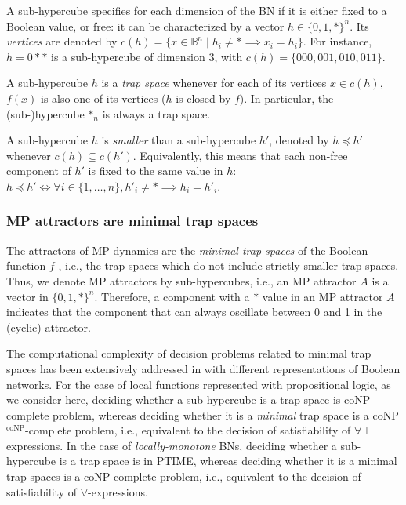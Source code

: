 \documentclass[PCJ,Unicode,screen,mode=plain]{cedram}
\begin{document}
A sub-hypercube specifies for each dimension of the BN if it is either
fixed to a Boolean value, or free: it can be characterized by a vector
\(h\in \{0,1,*\}^n\). Its \emph{vertices} are denoted by
\(c(h) = \{ x\in \mathbb B^n\mid h_i\neq *\implies x_i=h_i\}\). For
instance, \(h=0**\) is a sub-hypercube of dimension 3, with
\(c(h) = \{000, 001, 010, 011\}\).

A sub-hypercube \(h\) is a \emph{trap space} whenever for each of its
vertices \(x\in c(h)\), \(f(x)\) is also one of its vertices (\(h\) is
closed by \(f\)). In particular, the (sub-)hypercube \(\mathbf *_n\) is
always a trap space.

A sub-hypercube \(h\) is \emph{smaller} than a sub-hypercube \(h'\),
denoted by \(h \preceq h'\) whenever \(c(h)\subseteq c(h')\).
Equivalently, this means that each non-free component of \(h'\) is fixed
to the same value in \(h\):
\(h \preceq h' \iff \forall i\in \{1,\ldots,n\}, h'_i\neq *\implies h_i=h'_i\).

\hypertarget{mp-attractors-are-minimal-trap-spaces}{%
\subsubsection{MP attractors are minimal trap
spaces}\label{mp-attractors-are-minimal-trap-spaces}}

The attractors of MP dynamics are the \emph{minimal trap spaces} of the
Boolean function \(f\) \citep{Pauleve2020}, i.e., the trap spaces which
do not include strictly smaller trap spaces. Thus, we denote MP
attractors by sub-hypercubes, i.e., an MP attractor \(A\) is a vector in
\(\{0,1,*\}^n\). Therefore, a component with a \(*\) value in an MP
attractor \(A\) indicates that the component that can always oscillate
between 0 and 1 in the (cyclic) attractor.

The computational complexity of decision problems related to minimal
trap spaces has been extensively addressed in
\citep{TrapSpaceComplexity} with different representations of Boolean
networks. For the case of local functions represented with propositional
logic, as we consider here, deciding whether a sub-hypercube is a trap
space is coNP-complete problem, whereas deciding whether it is a
\emph{minimal} trap space is a coNP\(^\text{coNP}\)-complete problem,
i.e., equivalent to the decision of satisfiability of \(\forall\exists\)
expressions. In the case of \emph{locally-monotone} BNs, deciding
whether a sub-hypercube is a trap space is in PTIME, whereas deciding
whether it is a minimal trap spaces is a coNP-complete problem, i.e.,
equivalent to the decision of satisfiability of \(\forall\)-expressions.
\end{document}
